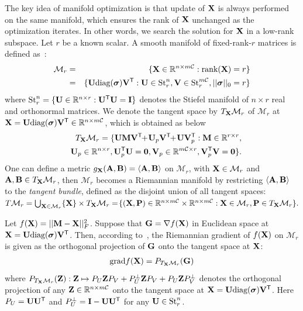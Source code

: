 \documentclass[10pt,twocolumn,letterpaper]{article}
\def\M{\mathcal{M}}
\def\R{{\mathbb R}}
\def\U{{\bf U}}
\def\V{{\bf V}}
\def\diag{\mbox{diag}}
\def\bsigma{\mbox{{\boldmath $\sigma$}}}
\def\trsp{{\sf T}}
\def\I{{\bf I}}
\def\0{{\bf 0}}
\def\G{{\bf G}}
\def\grad{{\text{grad}}}
\def\bZ{{\bf Z}}
\def\bB{{\bf B}}
\def\bM{{\bf M}}
\def\calC{{\mathcal{C}}}
\def\bX{{\bf X}}
\def\bA{{\bf A}}
\def\bX{{\bf X}}
\def\bP{{\bf P}}
\def\rank{{\text{rank}}}
\begin{document}
The key idea of manifold optimization is that update of $\bX$ is always performed on the same manifold, which ensures the rank of $\bX$ unchanged as the optimization iterates.
In other words, we search the solution for $\bX$ in a low-rank subspace.
Let $r$ be a known scalar.
A smooth manifold of fixed-rank-$r$ matrices is defined as~\cite{vandereycken2013lowrank}:
{\small
\begin{align}
\M_{r} &=& \{\bX\in \R^{n\times m\calC}: \rank(\bX) = r\} \nonumber \\
       &=& \{\U\diag(\bsigma)\V^{\trsp}: \U \in \textrm{St}_{r}^{n}, \V \in
           \textrm{St}_{r}^{m\calC}, ||\bsigma||_0 = r\} \nonumber
\end{align}
}
\noindent
where $\textrm{St}_{r}^{n} = \{\U \in \R^{n\times r}:
\U^{\trsp}\U = \I \}$ denotes the Stiefel manifold of $n\times r$ real and orthonormal matrices.
We denote the tangent space by $T_{\bX}\M_{r}$ of $\M_{r}$ at $\bX = \U\diag(\bsigma)\V^{\trsp} \in \R^{n \times m\calC}$,
which is obtained as below
{\small
\begin{align}
\label{eq:tangent_vector}
&&T_{\bX}\M_{r} =  \{\U\bM\V^{\trsp} \!\!+\! \U_p\V^{\trsp} \!\!+\!
\U\V_p^{\trsp}: \bM \in \R^{r\times r}, \nonumber\\ && \U_p \in \R^{n\times r},
\U_p^{\trsp}\U = \0, \V_p \in \R^{m\calC \times r}, \V_p^{\trsp}\V = \0\}.
\end{align}
}
\noindent
One can define a metric $g_{\bX}({\bA},{\bB}) = \langle{\bA},{\bB}\rangle$ on $\M_{r}$,
with $\bX \in \M_{r}$ and ${\bA},{\bB} \in T_{\bX}\M_{r}$,
then $\M_{r}$ becomes a Riemannian manifold by restricting
$\langle\bA,\bB\rangle$
to the \emph{tangent bundle}, defined as the disjoint union of all tangent spaces:
$T\M_{r} = \bigcup_{\bX\in \M_{r}}\{\bX\} \times T_{\bX}\M_{r}
         = \! \{(\bX,\bP)\in \R^{n \times m\calC} \times \R^{n \times m\calC}: \bX \in \M_{r}, \bP \in T_{\bX}\M_{r}\}.$


Let $f(\bX) = || \bM - \bX ||_F^2$.
Suppose that $\G = \nabla f(\bX)$ in Euclidean space at $\bX = \U\diag(\bsigma)\V^{\trsp}$.
Then, according to~\cite{vandereycken2013lowrank}, the Riemannian gradient of $f(\bX)$ on $\M_r$ is given as the orthogonal
projection of $\G$ onto the tangent space at $\bX$:
{\small
\begin{eqnarray}\label{eq:grad}
\grad{f(\bX)} = P_{T_{\bX}\M_{r}}(\G)
\end{eqnarray}
}
\noindent
where
$P_{T_{\bX}\M_{r}}(\bZ): \bZ \mapsto P_{U}\bZ P_{V} + P_{U}^{\perp} \bZ P_{V} + P_{U} \bZ P_{V}^{\perp}$
denotes the orthogonal projection of any
$\bZ \in \R^{n \times m\calC}$ onto the tangent space at $\bX = \U\diag(\bsigma)\V^{\trsp}$.
Here $P_U = \U \U^{\trsp}$ and $P_U^{\perp} = \I - \U \U^{\trsp}$ for any $\U \in \textrm{St}_{r}^{n}$.
\end{document}
